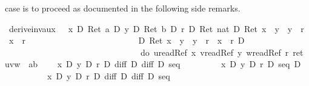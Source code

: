 \begin{isabellebody}
\begin{isamarkuptext}
  case is to proceed as documented in the following side remarks.%
\end{isamarkuptext}%
\isamarkuptrue%
\ derive{\isacharunderscore}inv{\isacharunderscore}aux{\isacharcolon}\ {\isachardoublequote}\ {\isasymturnstile}\ {\isacharasterisk}x\ {\isacharequal}\isactrlsub D\ Ret\ a\ {\isasymand}\isactrlsub D\ {\isacharasterisk}y\ {\isacharequal}\isactrlsub D\ Ret\ b\ {\isasymand}\isactrlsub D\ {\isacharasterisk}r\ {\isacharequal}\isactrlsub D\ Ret\ {\isacharparenleft}{}{\isacharcolon}{\isacharcolon}nat{\isacharparenright}\ {\isasymand}\isactrlsub D\ Ret\ {\isacharparenleft}x\ {\isasymnoteq}\ y\ {\isasymand}\ y\ {\isasymnoteq}\ r\ {\isasymand}\ x\ {\isasymnoteq}\ r{\isacharparenright}\ \isanewline
\ \ \ \ \ \ \ \ \ \ \ \ \ \ \ \ \ \ \ \ \ \ \ \ \ {\isasymlongrightarrow}\isactrlsub D\ Ret\ {\isacharparenleft}x\ {\isasymnoteq}\ y\ {\isasymand}\ y\ {\isasymnoteq}\ r\ {\isasymand}\ x\ {\isasymnoteq}\ r{\isacharparenright}\ {\isasymand}\isactrlsub D\ \isanewline
\ \ \ \ \ \ \ \ \ \ \ \ \ \ \ \ \ \ \ \ \ \ \ \ \ \ \ \ \ \ \ {\isasymUp}\ {\isacharparenleft}do\ {\isacharbraceleft}u{\isasymleftarrow}readRef\ x{\isacharsemicolon}\ v{\isasymleftarrow}readRef\ y{\isacharsemicolon}\ w{\isasymleftarrow}readRef\ r{\isacharsemicolon}\ ret\ {\isacharparenleft}u{\isacharasterisk}v{\isacharplus}w\ {\isacharequal}\ a{\isacharasterisk}b{\isacharparenright}{\isacharbraceright}{\isacharparenright}{\isachardoublequote}\isanewline
\ \ {\isacharparenleft}\ {\isachardoublequote}{\isasymturnstile}\ {\isacharquery}x\ {\isasymand}\isactrlsub D\ {\isacharquery}y\ {\isasymand}\isactrlsub D\ {\isacharquery}r\ {\isasymand}\isactrlsub D\ {\isacharquery}diff\ {\isasymlongrightarrow}\isactrlsub D\ {\isacharquery}diff\ {\isasymand}\isactrlsub D\ {\isacharquery}seq{\isachardoublequote}{\isacharparenright}\isanewline
\isamarkupfalse%
\ {\isacharminus}\isanewline
\ \ %
\isanewline
\ \ \isamarkupfalse%
\ {\isachardoublequote}{\isasymturnstile}\ {\isacharparenleft}{\isacharquery}x\ {\isasymand}\isactrlsub D\ {\isacharquery}y\ {\isasymand}\isactrlsub D\ {\isacharquery}r\ {\isasymlongrightarrow}\isactrlsub D\ {\isacharquery}seq{\isacharparenright}\ {\isasymlongrightarrow}\isactrlsub D\isanewline
\ \ \ \ \ \ \ \ \ \ {\isacharparenleft}{\isacharquery}x\ {\isasymand}\isactrlsub D\ {\isacharquery}y\ {\isasymand}\isactrlsub D\ {\isacharquery}r\ {\isasymand}\isactrlsub D\ {\isacharquery}diff\ {\isasymlongrightarrow}\isactrlsub D\ {\isacharquery}diff\ {\isasymand}\isactrlsub D\ {\isacharquery}seq{\isacharparenright}{\isachardoublequote}\ \isamarkupfalse%

\end{isabellebody}
